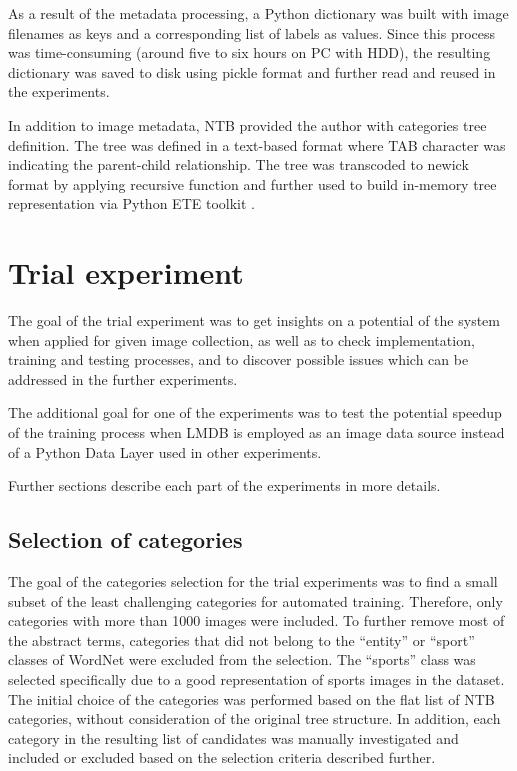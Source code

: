 As a result of the metadata processing, a Python dictionary was built with image filenames as keys and a corresponding list of labels as values. Since this process was time-consuming (around five to six hours on PC with HDD), the resulting dictionary was saved to disk using pickle \cite{pickle} format and further read and reused in the experiments.

In addition to image metadata, NTB provided the author with categories tree definition. The tree was defined in a text-based format where TAB character was indicating the parent-child relationship. The tree was transcoded to newick \cite{newick} format by applying recursive function and further used to build in-memory tree representation via Python ETE toolkit \cite{ete3}.


\section{Trial experiment}
    The goal of the trial experiment was to get insights on a potential of the system when applied for given image collection, as well as to check implementation, training and testing processes, and to discover possible issues which can be addressed in the further experiments.
    
    The additional goal for one of the experiments was to test the potential speedup of the training process when LMDB is employed as an image data source instead of a Python Data Layer used in other experiments.
    
    Further sections describe each part of the experiments in more details.
    
    \subsection{Selection of categories}
    \label{sec:trial-cat-selection}
    The goal of the categories selection for the trial experiments was to find a small subset of the least challenging categories for automated training. Therefore, only categories with more than 1000 images were included. To further remove most of the abstract terms, categories that did not belong to the ``entity'' or ``sport'' classes of WordNet \cite{wordnet} were excluded from the selection. The ``sports'' class was selected specifically due to a good representation of sports images in the dataset. The initial choice of the categories was performed based on the flat list of NTB categories, without consideration of the original tree structure. In addition, each category in the resulting list of candidates was manually investigated and included or excluded based on the selection criteria described further.
    
